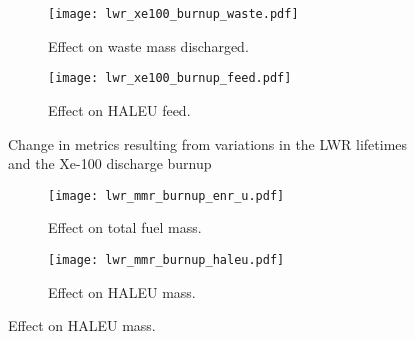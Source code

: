 \begin{figure}
    \ContinuedFloat    
    \begin{subfigure}[b]{0.48\textwidth}
        \centering
        \texttt{[image: lwr\_xe100\_burnup\_waste.pdf]}
        \caption{Effect on waste mass discharged.}
        \label{fig:lwr_xe100_burnup_waste}
    \end{subfigure}
    \hfill
    \begin{subfigure}[b]{0.48\textwidth}
        \centering
        \texttt{[image: lwr\_xe100\_burnup\_feed.pdf]}
        \caption{Effect on HALEU feed.}
        \label{fig:lwr_xe100_burnup_feed}
    \end{subfigure}
    \caption{Change in metrics resulting from variations in the 
    LWR lifetimes and the Xe-100 discharge burnup}
    \label{fig:lwr_xe100_burnup}
\end{figure}
\begin{figure}
    \begin{subfigure}[b]{0.48\textwidth}
        \centering
        \texttt{[image: lwr\_mmr\_burnup\_enr\_u.pdf]}
        \caption{Effect on total fuel mass.}
        \label{fig:lwr_mmr_burnup__enr_u}
    \end{subfigure}
    \hfill
    \begin{subfigure}[b]{0.48\textwidth}
        \centering
        \texttt{[image: lwr\_mmr\_burnup\_haleu.pdf]}
        \caption{Effect on HALEU mass.}
        \label{fig:lwr_mmr_burnup_haleu}
    \end{subfigure}
\end{figure}

